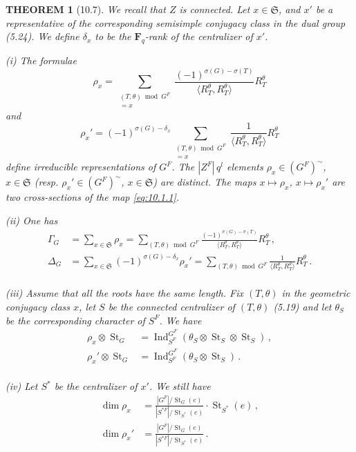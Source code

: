 \documentclass{amsart}
\theoremstyle{plain}
\newtheorem{theorem}{THEOREM}[section]
\theoremstyle{remark}
\DeclareMathOperator{\Ind}{Ind}
\DeclareMathOperator{\St}{St}
\begin{document}
\begin{theorem}[10.7]
We recall that $Z$ is connected. Let $x \in \mathfrak{S}$, and $x'$ be a representative of the corresponding semisimple conjugacy class in the dual group (5.24). We define $\delta_x$ to be the $\mathbf{F}_q$-rank of the centralizer of $x'$.

\emph{(i)} The formulae
\begin{equation}\label{eq:10.7.1}
\rho_x = \sum_{\substack{(T, \theta) \bmod G^F \\ [\theta] = x}} \frac{(-1)^{\sigma(G) - \sigma(T)}}{\langle R_T^\theta, R_T^\theta \rangle} R_T^\theta
\end{equation}
and
\begin{equation}\label{eq:10.7.2}
\rho_x' = (-1)^{\sigma(G) - \delta_x} \sum_{\substack{(T, \theta) \bmod G^F \\ [\theta] = x}} \frac{1}{\langle R_T^\theta, R_T^\theta \rangle} R_T^\theta
\end{equation}
define irreducible representations of $G^F$. The $|Z^F|\, q^l$ elements $\rho_x \in (G^F)^{\sim}$, $x \in \mathfrak{S}$ (resp. $\rho_x' \in (G^F)^{\sim}$, $x \in \mathfrak{S}$) are distinct. The maps $x \mapsto \rho_x$, $x \mapsto \rho_x'$ are two cross-sections of the map \eqref{eq:10.1.1}.

\emph{(ii)} One has
\begin{align}
\label{eq:10.7.3} \Gamma_G &= \sum_{x \in \mathfrak{S}} \rho_x = \sum_{(T, \theta) \bmod G^F} \frac{(-1)^{\sigma(G) - \sigma(T)}}{\langle R_T^\theta, R_T^\theta \rangle} R_T^\theta\,,\\
\label{eq:10.7.4} \Delta_G &= \sum_{x \in \mathfrak{S}} (-1)^{\sigma(G) - \delta_x} \rho_x' = \sum_{(T, \theta) \bmod G^F} \frac{1}{\langle R_T^\theta, R_T^\theta \rangle} R_T^\theta\,.\\
\end{align}

\emph{(iii)} Assume that all the roots have the same length. Fix $(T, \theta)$ in the geometric conjugacy class $x$, let $S$ be the connected centralizer of $(T, \theta)$ (5.19) and let $\theta_S$ be the corresponding character of $S^F$. We have
\begin{align}
\label{eq:10.7.5} \rho_x \otimes \St_G &= \Ind_{S^F}^{G^F}(\theta_S \otimes \St_S \otimes \St_S)\,,\\
\label{eq:10.7.6} \rho_x' \otimes \St_G &= \Ind_{S^F}^{G^F}(\theta_S \otimes \St_S)\,.\\
\end{align}

\emph{(iv)} Let $S^*$ be the centralizer of $x'$. We still have
\begin{align}
\label{eq:10.7.7} \dim \rho_x &= \frac{|G^F|/\St_G(e)}{|S^{*F}|/\St_{S^*}(e)} \cdot \St_{S^*}(e)\,,\\
\label{eq:10.7.8} \dim \rho_x' &= \frac{|G^F|/\St_G(e)}{|S^{*F}|/\St_{S^*}(e)}\,.\\
\end{align}
\end{theorem}
\end{document}
